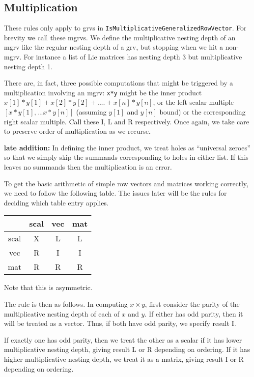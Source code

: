 \documentclass{article}
\begin{document}
\subsection{Multiplication}

These rules only apply to grvs in
\verb|IsMultiplicativeGeneralizedRowVector|. For brevity we call these
mgrvs. We define the multiplicative nesting depth of an mgrv like the
regular nesting depth of a grv, but stopping when we hit a
non-mgrv. For instance a list of Lie matrices has nesting depth 3 but
multiplicative nesting depth 1.

There are, in fact, three possible computations that might be
triggered by a multiplication involving an mgrv: \verb|x*y| might be
the inner product $x[1]*y[1] + x[2]*y[2] + ....+ x[n]*y[n]$, or the
left scalar multiple $[x*y[1], ... x*y[n]]$ (assuming $y[1]$ and
$y[n]$ bound) or the corresponding right scalar multiple. Call these
I, L and R respectively. Once again, we take care to preserve order of 
multiplication as we recurse.

\textbf{late addition:} 
In defining the inner product, we treat holes as ``universal zeroes''
so that we simply skip the summands corresponding to holes in either
list. If this leaves no summands then the multiplication is an error.

To get the basic arithmetic of simple row vectors and matrices working
correctly, we need to follow the following table. The issues later
will be the rules for deciding which table entry applies.

\begin{tabular}{c|ccc}
&scal&vec&mat\\
\hline
scal & X & L & L\\
vec & R & I & I\\
mat & R & R & R\\
\end{tabular}

Note that this is asymmetric.

The rule is then as follows. In computing $x\times y$, first consider the
parity of the multiplicative nesting depth of each of $x$ and $y$. If either has odd
parity, then it will be treated as a vector. Thus, if both have odd
parity, we specify result I.

If exactly one has odd parity, then we treat the other as a scalar if
it has lower multiplicative nesting depth, giving result L or R
depending on ordering. If it has higher multiplicative nesting depth,
we treat it as a matrix, giving result I or R depending on ordering.
\end{document}
